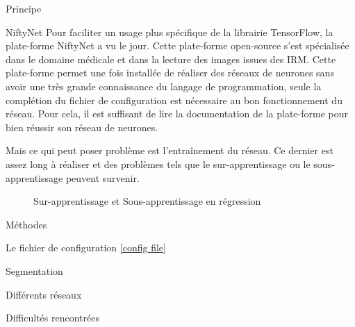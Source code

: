 \documentclass{book}
\newcommand{\p}{\vspace{0.2cm}}
\begin{document}
\begin{chapter}{Principe}
\begin{section}{NiftyNet}
			Pour faciliter un usage plus spécifique de la librairie TensorFlow, la plate-forme NiftyNet a vu le jour. Cette plate-forme open-source s'est spécialisée dans le domaine médicale et dans la lecture des images issues des IRM. Cette plate-forme permet une fois installée de réaliser des réseaux de neurones sans avoir une très grande connaissance du langage de programmation, seule la complétion du fichier de configuration est nécessaire au bon fonctionnement du réseau. Pour cela, il est suffisant de lire la documentation de la plate-forme pour bien réussir son réseau de neurones.\p

			Mais ce qui peut poser problème est l'entraînement du réseau. Ce dernier est assez long à réaliser et des problèmes tels que le sur-apprentissage ou le sous-apprentissage peuvent survenir.
			\begin{figure}
				\begin{center}
					\caption{Sur-apprentissage et Sous-apprentissage en régression}
					\label{over and under}
				\end{center}
			\end{figure}

		\end{section}

	\end{chapter}

	\begin{chapter}{Méthodes}

		\begin{section}{Le fichier de configuration}
			\ref{config file}
		\end{section}

		\begin{section}{Segmentation}

		\end{section}

		\begin{section}{Différents réseaux}

		\end{section}

	\end{chapter}

	\begin{chapter}{Difficultés rencontrées}

	\end{chapter}
\end{document}
